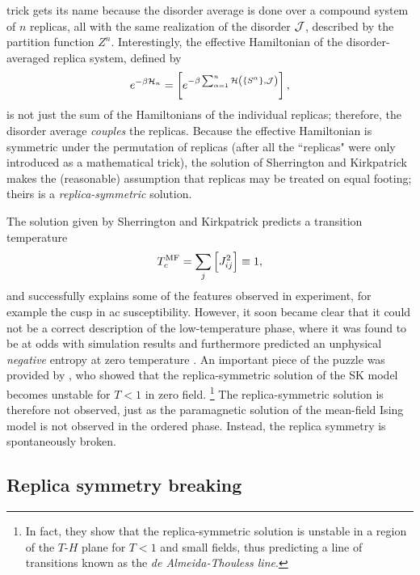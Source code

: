 trick gets its name because the disorder average is done over a compound system
of $n$ replicas, all with the same realization of the disorder $\mathcal{J}$, described
by the partition function $Z^n$. Interestingly, the effective Hamiltonian of
the disorder-averaged replica system, defined by
\begin{equation}
  e^{-\beta\ham_n} =
  \davc{e^{-\beta\sum_{\alpha=1}^n
  \ham\del{\cbr{S^{\alpha}},\JJ}}},
\end{equation}
is not just the sum of the Hamiltonians of the individual replicas; therefore,
the disorder average \emph{couples} the replicas. Because the effective
Hamiltonian is symmetric under the permutation of replicas (after all the
``replicas" were only introduced as a mathematical trick), the solution of
Sherrington and Kirkpatrick makes the (reasonable) assumption that replicas may
be treated on equal footing; theirs is a \emph{replica-symmetric} solution.

The solution given by Sherrington and Kirkpatrick predicts a transition
temperature
\begin{equation}
  T_c^{\mathrm{MF}} = \sum_j \left[J_{ij}^2\right] \equiv 1,
\end{equation}
and successfully explains some of the features observed in experiment, for
example the cusp in ac susceptibility. However, it soon became clear that it
could not be a correct description of the low-temperature phase, where it was
found to be at odds with simulation results and furthermore predicted an
unphysical \emph{negative} entropy at zero temperature
\autocite{kirkpatrick1978infinite}. An important piece of the puzzle was
provided by \textcite{dealmeida1978stability}, who showed that the
replica-symmetric solution of the SK model becomes unstable for $T<1$ in zero
field.%
\footnote{
  In fact, they show that the replica-symmetric solution is unstable in a
  region of the $T$-$H$ plane for $T<1$ and small fields, thus predicting
  a line of transitions known as the \emph{de Almeida-Thouless line}.
}
The replica-symmetric solution is therefore not observed, just as the
paramagnetic solution of the mean-field Ising model is not observed in the
ordered phase. Instead, the replica symmetry is spontaneously broken.


\subsection{Replica symmetry breaking}
\label{sec:intro-rsb}

